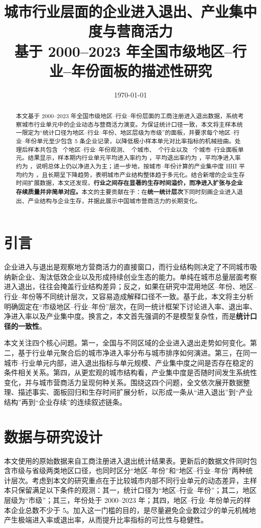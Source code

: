 \documentclass[12pt]{article}
\title{\bfseries 城市行业层面的企业进入退出、产业集中度与营商活力\\[0.4em]
{\large 基于 2000--2023 年全国市级地区--行业--年份面板的描述性研究}}
\author{}
\date{\today}
\begin{document}
\maketitle

\begin{abstract}
本文基于 2000--2023 年全国市级地区--行业--年份层面的工商注册进入退出数据，系统考察城市行业单元中的企业动态与营商活力演变。为保证统计口径一致，本文将主样本统一限定为“统计口径为地区--行业--年份、地区层级为市级”的面板，并要求每个地区--行业--年份单元至少包含 5 条企业记录，以降低极小样本单元对比率指标的机械扭曲。处理后样本共包含 \SampleObs\ 个地区--行业--年份观测、\SampleCities\ 个城市、\SampleIndustries\ 个行业以及 \SamplePanels\ 个城市--行业面板单元。结果显示，样本期内行业单元平均进入率约为 \MeanEntryRate，平均退出率约为 \MeanExitRate，平均净进入率约为 \MeanNetRate，说明总体上仍以净进入为主；进一步地，按城市--年份计算的产业集中度 HHI 平均约为 \MeanCityHHI，且长期呈下降趋势，表明城市产业结构整体趋于多元化。结合新增的企业生存时间扩展数据，本文还发现，\textbf{行业之间存在显著的生存时间溢价，而净进入扩张与企业存续质量并非简单对应。}本文的主要贡献在于：在\textbf{统一统计层次}下同时刻画企业进入退出、产业结构与企业生存，并据此展示中国城市营商活力的长期变化。
\end{abstract}

\section{引言}
企业进入与退出是观察地方营商活力的直接窗口，而行业结构则决定了不同城市吸纳新企业、淘汰低效企业以及形成持续创业生态的能力。单纯在城市总量层面考察进入退出，往往会掩盖行业结构差异；反之，如果在研究中混用地区--年份、地区--行业--年份等不同统计层次，又容易造成解释口径不一致。基于此，本文将主分析明确固定在“市级地区--行业--年份”层次，在同一统计框架下讨论进入率、退出率、净进入率以及产业集中度。换言之，本文首先强调的不是模型复杂性，而是\textbf{统计口径的一致性}。

本文关注四个核心问题。第一，全国与不同区域的企业进入退出走势如何变化。第二，基于行业单元聚合后的城市净进入率分布与城市排序如何演进。第三，在同一城市--行业单元内部，进入退出指标与单元规模、产业集中度之间是否存在稳定的条件相关关系。第四，从更宏观的城市结构看，产业集中度是否随时间发生系统性变化，并与城市营商活力呈现何种关系。围绕这四个问题，全文依次展开数据整理、描述事实、面板回归和生存时间扩展分析，以形成一条从“进入退出”到“产业结构”再到“企业存续”的连续叙述链条。

\section{数据与研究设计}
本文使用的原始数据来自工商注册进入退出统计结果表。更新后的数据文件同时包含市级与省级两类地区口径，也同时区分“地区--年份”和“地区--行业--年份”两种统计层次。考虑到本文的研究重点在于比较城市内部不同行业单元的动态差异，主样本只保留满足以下条件的观测：其一，统计口径为“地区--行业--年份”；其二，地区层级为“市级”；其三，年份处于 2000--2023 年；其四，地区--行业--年份单元的样本企业总数不少于 5。加入这一门槛的目的，是尽量避免企业数过少的单元机械地产生极端进入率或退出率，从而提升比率指标的可比性与稳健性。
\end{document}
